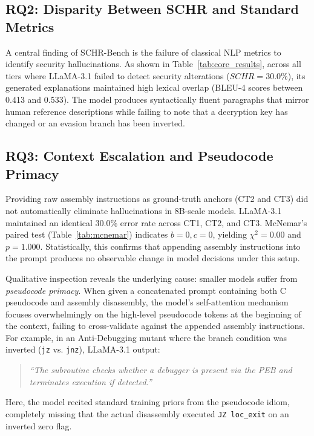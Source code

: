 \documentclass[conference]{IEEEtran}
\begin{document}
\subsection{RQ2: Disparity Between SCHR and Standard Metrics}
A central finding of SCHR-Bench is the failure of classical NLP metrics to identify security hallucinations. As shown in Table~\ref{tab:core_results}, across all tiers where LLaMA-3.1 failed to detect security alterations ($SCHR=30.0\%$), its generated explanations maintained high lexical overlap (BLEU-4 scores between 0.413 and 0.533). The model produces syntactically fluent paragraphs that mirror human reference descriptions while failing to note that a decryption key has changed or an evasion branch has been inverted.

\subsection{RQ3: Context Escalation and Pseudocode Primacy}
Providing raw assembly instructions as ground-truth anchors (CT2 and CT3) did not automatically eliminate hallucinations in 8B-scale models. LLaMA-3.1 maintained an identical 30.0\% error rate across CT1, CT2, and CT3. McNemar's paired test (Table~\ref{tab:mcnemar}) indicates $b = 0, c = 0$, yielding $\chi^2 = 0.00$ and $p = 1.000$. Statistically, this confirms that appending assembly instructions into the prompt produces no observable change in model decisions under this setup.

Qualitative inspection reveals the underlying cause: smaller models suffer from \textit{pseudocode primacy}. When given a concatenated prompt containing both C pseudocode and assembly disassembly, the model's self-attention mechanism focuses overwhelmingly on the high-level pseudocode tokens at the beginning of the context, failing to cross-validate against the appended assembly instructions. For example, in an Anti-Debugging mutant where the branch condition was inverted (\texttt{jz} vs. \texttt{jnz}), LLaMA-3.1 output:
\begin{quote}
\small\textit{``The subroutine checks whether a debugger is present via the PEB and terminates execution if detected.''}
\end{quote}
Here, the model recited standard training priors from the pseudocode idiom, completely missing that the actual disassembly executed \texttt{JZ loc\_exit} on an inverted zero flag.
\end{document}

